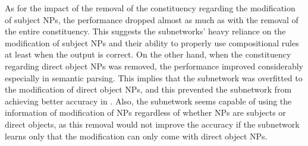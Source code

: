 As for the impact of the removal of the constituency regarding the modification of subject NPs, the performance dropped almost as much as with the removal of the entire constituency.
This suggests the subnetworks' heavy reliance on the modification of subject NPs and their ability to properly use compositional rules at least when the output is correct.
On the other hand, when the constituency regarding direct object NPs was removed, the performance improved considerably especially in semantic parsing.
This implies that the subnetwork was overfitted to the modification of direct object NPs, and this prevented the subnetwork from achieving better accuracy in \dobjppsubjpp{}.
Also, the subnetwork seems capable of using the information of modification of NPs regardless of whether NPs are subjects or direct objects, as this removal would not improve the accuracy if the subnetwork learns only that the modification can only come with direct object NPs.
